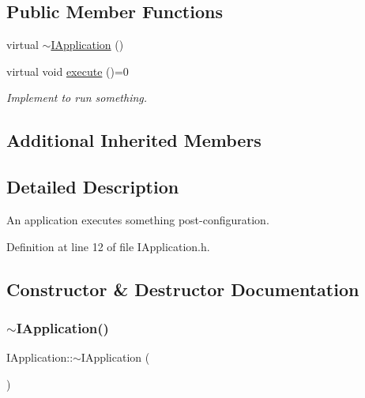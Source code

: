 \subsection*{Public Member Functions}
\begin{DoxyCompactItemize}
\item 
virtual \hyperlink{class_wire_cell_1_1_i_application_ad3a2a66c8f34da098a2f5eecc3970c10}{$\sim$\+I\+Application} ()
\item 
virtual void \hyperlink{class_wire_cell_1_1_i_application_a5c77275a37093541aaad6410d8ce5c31}{execute} ()=0
\begin{DoxyCompactList}\small\item\em Implement to run something. \end{DoxyCompactList}\end{DoxyCompactItemize}
\subsection*{Additional Inherited Members}


\subsection{Detailed Description}
An application executes something post-\/configuration. 

Definition at line 12 of file I\+Application.\+h.



\subsection{Constructor \& Destructor Documentation}
\mbox{\label{class_wire_cell_1_1_i_application_ad3a2a66c8f34da098a2f5eecc3970c10}} 
\subsubsection{\texorpdfstring{$\sim$\+I\+Application()}{~IApplication()}}
{\footnotesize\ttfamily I\+Application\+::$\sim$\+I\+Application (\begin{DoxyParamCaption}{ }\end{DoxyParamCaption})\hspace{0.3cm}{\ttfamily [virtual]}}



